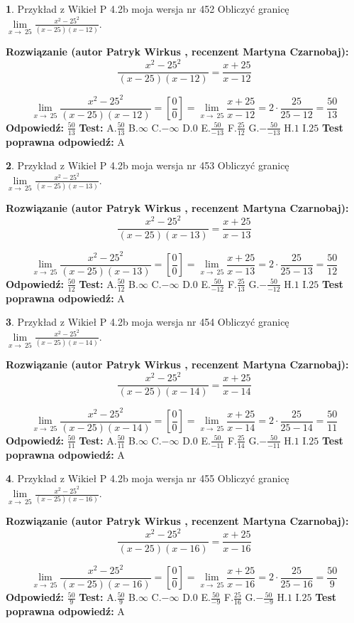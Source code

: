 \documentclass[12pt, a4paper]{article}
\theoremstyle{definition} %
\newtheorem{zad}{}
\newcommand{\zadStart}[1]{\begin{zad}#1\newline}
\newcommand{\zadStop}{\end{zad}}
\newcommand{\rozwStart}[2]{\noindent \textbf{Rozwiązanie (autor #1 , recenzent #2): }\newline}
\newcommand{\rozwStop}{\newline}
\newcommand{\odpStart}{\noindent \textbf{Odpowiedź:}\newline}
\newcommand{\odpStop}{\newline}
\newcommand{\testStart}{\noindent \textbf{Test:}\newline}
\newcommand{\testStop}{\newline}
\newcommand{\kluczStart}{\noindent \textbf{Test poprawna odpowiedź:}\newline}
\newcommand{\kluczStop}{\newline}
\begin{document}
\zadStart{Przykład z Wikieł P 4.2b moja wersja nr 452}
Obliczyć granicę $\lim\limits_{x\to\ 25}\frac{x^{2}-25^{2}}{(x-25)(x-12)}$.
\zadStop
\rozwStart{Patryk Wirkus}{Martyna Czarnobaj}
$$\frac{x^{2}-25^{2}}{(x-25)(x-12)}=\frac{x+25}{x-12}$$

$$\lim\limits_{x\to\ 25}\frac{x^{2}-25^{2}}{(x-25)(x-12)}=[\frac{0}{0}]=\lim\limits_{x\to\ 25}\frac{x+25}{x-12}=2 \cdot \frac{25}{25-12} = \frac{50}{13}$$
\rozwStop
\odpStart
$\frac{50}{13}$
\odpStop
\testStart
A.$\frac{50}{13}$
B.$\infty$
C.$-\infty$
D.$0$
E.$\frac{50}{-13}$
F.$\frac{25}{12}$
G.$-\frac{50}{-13}$
H.$1$
I.$25$
\testStop
\kluczStart
A
\kluczStop



\zadStart{Przykład z Wikieł P 4.2b moja wersja nr 453}
Obliczyć granicę $\lim\limits_{x\to\ 25}\frac{x^{2}-25^{2}}{(x-25)(x-13)}$.
\zadStop
\rozwStart{Patryk Wirkus}{Martyna Czarnobaj}
$$\frac{x^{2}-25^{2}}{(x-25)(x-13)}=\frac{x+25}{x-13}$$

$$\lim\limits_{x\to\ 25}\frac{x^{2}-25^{2}}{(x-25)(x-13)}=[\frac{0}{0}]=\lim\limits_{x\to\ 25}\frac{x+25}{x-13}=2 \cdot \frac{25}{25-13} = \frac{50}{12}$$
\rozwStop
\odpStart
$\frac{50}{12}$
\odpStop
\testStart
A.$\frac{50}{12}$
B.$\infty$
C.$-\infty$
D.$0$
E.$\frac{50}{-12}$
F.$\frac{25}{13}$
G.$-\frac{50}{-12}$
H.$1$
I.$25$
\testStop
\kluczStart
A
\kluczStop



\zadStart{Przykład z Wikieł P 4.2b moja wersja nr 454}
Obliczyć granicę $\lim\limits_{x\to\ 25}\frac{x^{2}-25^{2}}{(x-25)(x-14)}$.
\zadStop
\rozwStart{Patryk Wirkus}{Martyna Czarnobaj}
$$\frac{x^{2}-25^{2}}{(x-25)(x-14)}=\frac{x+25}{x-14}$$

$$\lim\limits_{x\to\ 25}\frac{x^{2}-25^{2}}{(x-25)(x-14)}=[\frac{0}{0}]=\lim\limits_{x\to\ 25}\frac{x+25}{x-14}=2 \cdot \frac{25}{25-14} = \frac{50}{11}$$
\rozwStop
\odpStart
$\frac{50}{11}$
\odpStop
\testStart
A.$\frac{50}{11}$
B.$\infty$
C.$-\infty$
D.$0$
E.$\frac{50}{-11}$
F.$\frac{25}{14}$
G.$-\frac{50}{-11}$
H.$1$
I.$25$
\testStop
\kluczStart
A
\kluczStop



\zadStart{Przykład z Wikieł P 4.2b moja wersja nr 455}
Obliczyć granicę $\lim\limits_{x\to\ 25}\frac{x^{2}-25^{2}}{(x-25)(x-16)}$.
\zadStop
\rozwStart{Patryk Wirkus}{Martyna Czarnobaj}
$$\frac{x^{2}-25^{2}}{(x-25)(x-16)}=\frac{x+25}{x-16}$$

$$\lim\limits_{x\to\ 25}\frac{x^{2}-25^{2}}{(x-25)(x-16)}=[\frac{0}{0}]=\lim\limits_{x\to\ 25}\frac{x+25}{x-16}=2 \cdot \frac{25}{25-16} = \frac{50}{9}$$
\rozwStop
\odpStart
$\frac{50}{9}$
\odpStop
\testStart
A.$\frac{50}{9}$
B.$\infty$
C.$-\infty$
D.$0$
E.$\frac{50}{-9}$
F.$\frac{25}{16}$
G.$-\frac{50}{-9}$
H.$1$
I.$25$
\testStop
\kluczStart
A
\kluczStop
\end{document}
